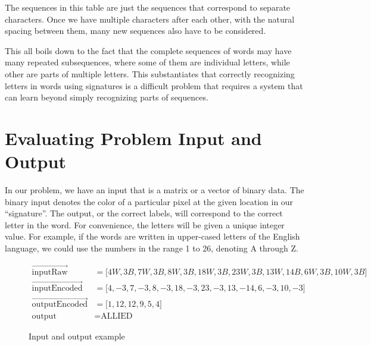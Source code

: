 The sequences in this table are just the sequences that correspond to separate characters. Once we have multiple characters after each other, with the natural spacing between them, many new sequences also have to be considered. 

This all boils down to the fact that the complete sequences of words may have many repeated subsequences, where some of them are individual letters, while other are parts of multiple letters. This substantiates that correctly recognizing letters in words using signatures is a difficult problem that requires a system that can learn beyond simply recognizing parts of sequences.


\section{Evaluating Problem Input and Output}
\label{sec:evaluating_problem_input_and_output}
In our problem, we have an input that is a matrix or a vector of binary data. The binary input denotes the color of a particular pixel at the given location in our ``signature''. The output, or the correct labels, will correspond to the correct letter in the word. For convenience, the letters will be given a unique integer value. For example, if the words are written in upper-cased letters of the English language, we could use the numbers in the range 1 to 26, denoting A through Z.

\begin{figure}[h]
    \renewcommand\figurename{Example}
    \begin{equation*}
        \begin{aligned}
           \vec{\text{inputRaw}}               &= \lbrack 4W, 3B, 7W, 3B, 8W, 3B, 18W, 3B, 23W, 3B, 13W, 14B, 6W, 3B, 10W, 3B \rbrack \\
           \vec{\text{inputEncoded}}           &= \lbrack 4, -3, 7, -3, 8, -3, 18, -3, 23, -3, 13, -14, 6, -3, 10, -3 \rbrack \\
           \vec{\text{outputEncoded}}          &= \lbrack 1, 12, 12, 9, 5, 4 \rbrack \\
           \text{output}                       &= \text{ALLIED}
        \end{aligned}
    \end{equation*}
    \caption{Input and output example}
    \label{eq:input_output_example}
\end{figure}

